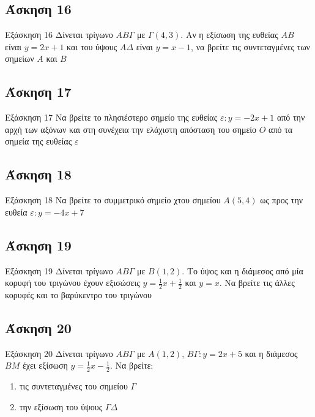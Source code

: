 \documentclass[greek]{beamer}
\begin{document}
\subsection{Άσκηση 16}
\begin{frame}[label=Άσκηση16]{Εξάσκηση 16}
 Δίνεται τρίγωνο $ΑΒΓ$ με $Γ(4,3)$. Αν η εξίσωση της ευθείας $ΑΒ$ είναι $y=2x+1$ και του ύψους $ΑΔ$ είναι $y=x-1$, να βρείτε τις συντεταγμένες των σημείων $Α$ και $Β$

\end{frame}

\subsection{Άσκηση 17}
\begin{frame}[label=Άσκηση17]{Εξάσκηση 17}
 Να βρείτε το πλησιέστερο σημείο της ευθείας $ε:y=-2x+1$ από την αρχή των αξόνων και στη συνέχεια την ελάχιστη απόσταση του σημείο $Ο$ από τα σημεία της ευθείας $ε$

\end{frame}

\subsection{Άσκηση 18}
\begin{frame}[label=Άσκηση18]{Εξάσκηση 18}
 Να βρείτε το συμμετρικό σημείο χτου σημείου $Α(5,4)$ ως προς την ευθεία $ε:y=-4x+7$

\end{frame}

\subsection{Άσκηση 19}
\begin{frame}[label=Άσκηση19]{Εξάσκηση 19}
 Δίνεται τρίγωνο $ΑΒΓ$ με $Β(1,2)$. Το ύψος και η διάμεσος από μία κορυφή του τριγώνου έχουν εξισώσεις $y=\frac{1}{2}x+\frac{1}{2}$ και $y=x$. Να βρείτε τις άλλες κορυφές και το βαρύκεντρο του τριγώνου

\end{frame}

\subsection{Άσκηση 20}
\begin{frame}[label=Άσκηση20 ]{Εξάσκηση 20}
 Δίνεται τρίγωνο $ΑΒΓ$ με $Α(1,2)$, $ΒΓ:y=2x+5$ και η διάμεσος $ΒΜ$ έχει εξίσωση $y=\frac{1}{2}x-\frac{1}{2}$. Να βρείτε:
 \begin{enumerate}
  \item<1-> τις συντεταγμένες του σημείου $Γ$
  \item<2-> την εξίσωση του ύψους $ΓΔ$
 \end{enumerate}

\end{frame}
\end{document}
